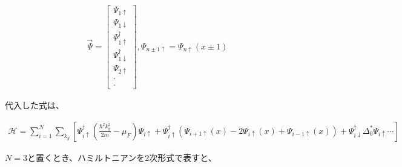 \documentclass{jsarticle}
\begin{document}
		\begin{align}
			\vec{\Psi}=
			\begin{bmatrix}
				\Psi_{1\uparrow} \\
				\Psi_{1\downarrow} \\
				\Psi_{1\uparrow}^\dagger \\
				\Psi_{1\downarrow}^\dagger \\
				\Psi_{2\uparrow} \\
				\cdot \\
				\cdot
			\end{bmatrix},
			\Psi_{n\pm 1\uparrow}=\Psi_{n\uparrow}\left(x\pm 1\right)
		\end{align}

		代入した式は、

		\begin{align}
			\mathcal{H}= \sum_{i=1}^N \sum_{k_y}
			\left[ \Psi^\dagger_{i\uparrow} \left( \frac{\hbar^2k_y^2}{2m}-\mu_F \right)\Psi_{i\uparrow}
			+\Psi^\dagger_{i\uparrow} \left( \Psi_{i+1\uparrow}\left(x\right)-2\Psi_{i\uparrow}\left(x\right)+\Psi_{i-1\uparrow}\left(x\right)
			\right)+\Psi^\dagger_{i\downarrow} \Delta_0^\ast \Psi_{i\uparrow} \cdots
			\right]
			\label{hamil3}
		\end{align}

		$N=3$と置くとき、ハミルトニアンを2次形式で表すと、
\end{document}
